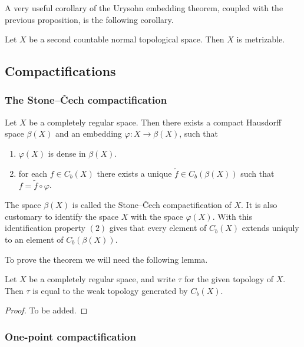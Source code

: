 \documentclass[11pt,a4paper]{article}
\begin{document}
A very useful corollary of the Urysohn embedding theorem, coupled with
the previous proposition, is the following corollary.

\begin{corollary}
  Let $X$ be a second countable normal topological space.
  Then $X$ is metrizable.
\end{corollary}

\subsection{Compactifications}

\subsubsection{The Stone--\v{C}ech compactification}

\begin{theorem}
  Let $X$ be a completely regular space.
  Then there exists a compact Hausdorff space $\beta(X)$ and an embedding
  $\varphi \colon X \to \beta(X)$, such that
  \begin{enumerate}
    \item[(1)] $\varphi(X)$ is dense in $\beta(X)$.
    \item[(2)] for each $f \in C_b(X)$ there exists a unique 
      $\tilde f \in C_b(\beta(X))$ such that $f = \tilde f \circ \varphi$.
  \end{enumerate}
\end{theorem}

\begin{remark}
  The space $\beta(X)$ is called the Stone--\v{C}ech compactification of
  $X$. It is also customary to identify the space $X$ with the space
  $\varphi(X)$. With this identification property $(2)$ gives that
  every element of $C_b(X)$ extends uniquly to an element of $C_b(\beta(X))$.
\end{remark}

To prove the theorem we will need the following lemma.

\begin{lemma}
  Let $X$ be a completely regular space, and write $\tau$ for the given
  topology of $X$.
  Then $\tau$ is equal to the weak topology generated by $C_b(X)$.
\end{lemma}
\begin{proof}
  To be added.
\end{proof}

\subsubsection{One-point compactification}
\end{document}
